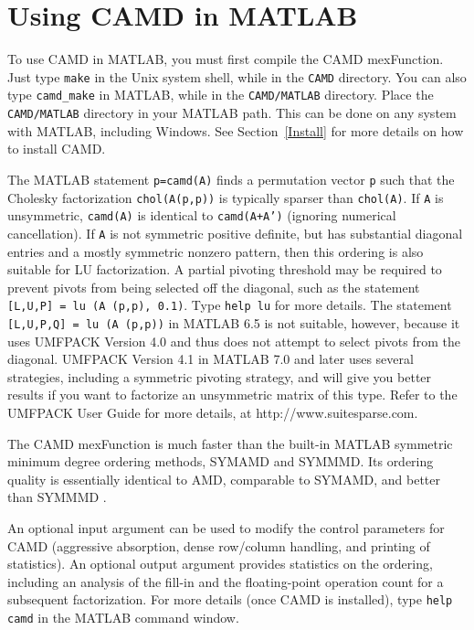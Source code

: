 \documentclass[11pt]{article}
\begin{document}
\section{Using CAMD in MATLAB}

To use CAMD in MATLAB, you must first compile the CAMD mexFunction.
Just type {\tt make} in the Unix system shell, while in the {\tt CAMD}
directory.  You can also type {\tt camd\_make} in MATLAB, while in the
{\tt CAMD/MATLAB} directory.  Place the {\tt CAMD/MATLAB} directory in your
MATLAB path.  This can be done on any system with MATLAB, including Windows.
See Section~\ref{Install} for more details on how to install CAMD.

The MATLAB statement {\tt p=camd(A)} finds a permutation vector {\tt p} such
that the Cholesky factorization {\tt chol(A(p,p))} is typically sparser than
{\tt chol(A)}.
If {\tt A} is unsymmetric, {\tt camd(A)} is identical to {\tt camd(A+A')}
(ignoring numerical cancellation).
If {\tt A} is not symmetric positive definite,
but has substantial diagonal entries and a mostly symmetric nonzero pattern,
then this ordering is also suitable for LU factorization.  A partial pivoting
threshold may be required to prevent pivots from being selected off the
diagonal, such as the statement {\tt [L,U,P] = lu (A (p,p), 0.1)}.
Type {\tt help lu} for more details.
The statement {\tt [L,U,P,Q] = lu (A (p,p))} in MATLAB 6.5 is
not suitable, however, because it uses UMFPACK Version 4.0 and thus
does not attempt to select pivots from the diagonal.
UMFPACK Version 4.1 in MATLAB 7.0 and later
uses several strategies, including a symmetric pivoting strategy, and
will give you better results if you want to factorize an unsymmetric matrix
of this type.  Refer to the UMFPACK User Guide for more details, at
http://www.suitesparse.com.

The CAMD mexFunction is much faster than the built-in MATLAB symmetric minimum
degree ordering methods, SYMAMD and SYMMMD.  Its ordering quality is
essentially identical to AMD, comparable to SYMAMD, and better than SYMMMD
\cite{DavisGilbertLarimoreNg04}.

An optional input argument can be used to modify the control parameters for
CAMD (aggressive absorption, dense row/column handling, and printing of
statistics).  An optional output
argument provides statistics on the ordering, including an analysis of the
fill-in and the floating-point operation count for a subsequent factorization.
For more details (once CAMD is installed),
type {\tt help camd} in the MATLAB command window.
\end{document}
